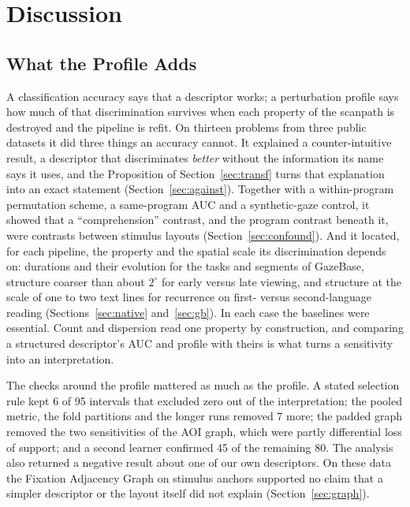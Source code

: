 \documentclass[11pt]{article}
\begin{document}


\section{Discussion}
\subsection{What the Profile Adds}
A classification accuracy says that a descriptor works; a perturbation profile says how much of that discrimination survives when each property of the scanpath is destroyed and the pipeline is refit. On thirteen problems from three public datasets it did three things an accuracy cannot. It explained a counter-intuitive result, a descriptor that discriminates \emph{better} without the information its name says it uses, and the Proposition of Section~\ref{sec:transf} turns that explanation into an exact statement (Section~\ref{sec:against}). Together with a within-program permutation scheme, a same-program AUC and a synthetic-gaze control, it showed that a ``comprehension'' contrast, and the program contrast beneath it, were contrasts between stimulus layouts (Section~\ref{sec:confound}). And it located, for each pipeline, the property and the spatial scale its discrimination depends on: durations and their evolution for the tasks and segments of GazeBase, structure coarser than about $2^\circ$ for early versus late viewing, and structure at the scale of one to two text lines for recurrence on first- versus second-language reading (Sections~\ref{sec:native} and~\ref{sec:gb}). In each case the baselines were essential. Count and dispersion read one property by construction, and comparing a structured descriptor's AUC and profile with theirs is what turns a sensitivity into an interpretation.

The checks around the profile mattered as much as the profile. A stated selection rule kept 6 of 95 intervals that excluded zero out of the interpretation; the pooled metric, the fold partitions and the longer runs removed 7 more; the padded graph removed the two sensitivities of the AOI graph, which were partly differential loss of support; and a second learner confirmed 45 of the remaining 80. The analysis also returned a negative result about one of our own descriptors. On these data the Fixation Adjacency Graph on stimulus anchors supported no claim that a simpler descriptor or the layout itself did not explain (Section~\ref{sec:graph}).
\end{document}
